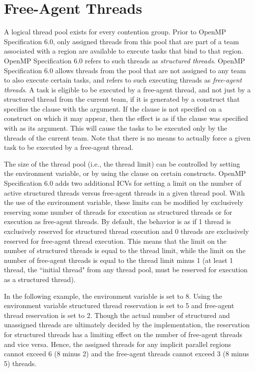 \section{Free-Agent Threads}
\label{sec:free_agent}

A logical thread pool exists for every contention group. Prior to OpenMP
Specification 6.0, only assigned
threads from this pool that are part of a team associated with a  region are 
available to execute tasks that bind to that  region. OpenMP
Specification 6.0 refers to
such threads as \emph{structured threads}. 
OpenMP Specification 6.0 allows threads from the pool that are not assigned to any team to also execute
certain tasks, and refers to such executing threads as \emph{free-agent threads}. 
A task is eligible to be executed by a free-agent thread, and not just by a structured thread 
from the current team, if it is generated by a construct that specifies the  
clause with the  argument. If the  clause is not specified on a construct 
on which it may appear, then the effect is as if the  clause was specified 
with  as its argument. This will cause the tasks to be executed only by the
threads of the current team.
Note that there is no means to actually force a given task to be executed by a free-agent thread.

The size of the thread pool (i.e., the thread limit) can be controlled by setting the 
 environment variable, or by using the  clause on 
certain constructs. OpenMP Specification 6.0 adds two additional ICVs for setting a limit on the number of active
structured threads versus free-agent threads in a given thread pool. 
With the use of the  environment variable, these limits can be 
modified by exclusively reserving some number of threads for execution as structured threads or 
for execution as free-agent threads. By default, the behavior is as if 1 thread is exclusively 
reserved for structured thread execution and 0 threads are exclusively reserved for free-agent thread 
execution. This means that the limit on the number of structured threads is equal to the thread 
limit, while the limit on the number of free-agent threads is equal to the thread limit 
minus 1 (at least 1 thread, the ``initial thread" from any thread pool, must be reserved for execution 
as a structured thread). 

In the following example, the  environment variable is set to 8. Using the 
environment variable structured thread reservation is set to 5 and free-agent thread reservation is set to 2. 
Though the actual number of structured and unassigned threads are ultimately decided by the implementation, 
the reservation for structured threads has a limiting effect on the number of free-agent threads and vice versa. 
Hence, the assigned threads for any implicit parallel regions cannot exceed 6 (8 minus 2) and the 
free-agent threads cannot exceed 3 (8 minus 5) threads.

